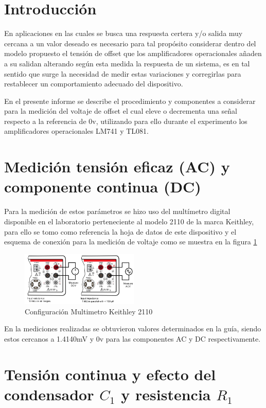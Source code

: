 \section*{Introducción}
En aplicaciones en las cuales se busca una respuesta certera y/o salida muy cercana a un valor deseado es necesario para tal propósito considerar dentro del modelo propuesto el tensión de offset que los amplificadores operacionales añaden a su salidan alterando según esta medida la respuesta de un sistema, es en tal sentido que surge la necesidad de medir  estas variaciones y corregirlas para restablecer un comportamiento adecuado del dispositivo.

En el presente informe se describe el procedimiento y componentes a considerar para la medición del voltaje de offset el cual eleve o decrementa una señal respecto a la referencia de 0v, utilizando para ello durante el experimento los amplificadores operacionales LM741 y TL081.

\section{Medición tensión eficaz (AC) y componente continua (DC)}

Para la medición de estos parámetros se hizo uso del multímetro digital disponible en el laboratorio perteneciente al modelo 2110 de la marca Keithley, para ello se tomo como referencia la hoja de datos de este dispositivo y el esquema de conexión para la medición de voltaje como se muestra en la figura \ref{fig:configuracion-multimetro}

\begin{figure}[h]
	\centering
	\includegraphics[width=0.5\textwidth]{media/configuracion-multimetro}
	\caption{Configuración Multimetro Keithley 2110}
	\label{fig:configuracion-multimetro}
\end{figure}

En la mediciones realizadas se obtuvieron valores determinados en la guía, siendo estos cercanos a 1.4140mV y 0v para las componentes AC y DC respectivamente.

\section{Tensión continua y efecto del condensador $C_1$ y resistencia $R_1$}

